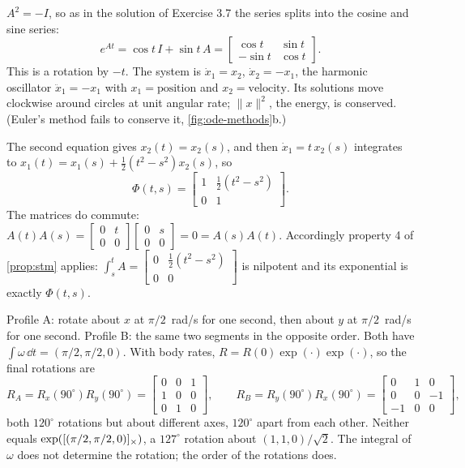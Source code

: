 \begin{solutions}
  \item $A^2 = -I$, so as in the solution of Exercise 3.7 the series splits into the cosine and sine series:
        \[
          e^{At} = \cos t\,I + \sin t\,A = \begin{bmatrix}\cos t & \sin t\\ -\sin t & \cos t\end{bmatrix}.
        \]
        This is a rotation by $-t$. The system is $\dot x_1 = x_2$, $\dot x_2 = -x_1$, the harmonic oscillator $\ddot x_1 = -x_1$ with
        $x_1 = \text{position}$ and $x_2 = \text{velocity}$. Its solutions move clockwise around circles at unit angular rate; $\|x\|^2$, the energy, is
        conserved. (Euler's method fails to conserve it, \cref{fig:ode-methods}b.)

  \item The second equation gives $x_2(t) = x_2(s)$, and then $\dot x_1 = t\,x_2(s)$ integrates to $x_1(t) = x_1(s) + \tfrac12(t^2 - s^2)x_2(s)$, so
        \[
          \Phi(t, s) = \begin{bmatrix}1 & \tfrac12(t^2 - s^2)\\ 0 & 1\end{bmatrix}.
        \]
        The matrices do commute: $A(t)A(s) = \begin{bmatrix}0 & t\\0 & 0\end{bmatrix}\begin{bmatrix}0 & s\\0 & 0\end{bmatrix} = 0 = A(s)A(t)$.
        Accordingly property 4 of \cref{prop:stm} applies: $\int_s^tA = \begin{bmatrix}0 & \frac12(t^2 - s^2)\\0 & 0\end{bmatrix}$ is nilpotent and its
        exponential is exactly $\Phi(t, s)$.

  \item Profile A: rotate about $x$ at $\pi/2$~rad/s for one second, then about $y$ at $\pi/2$~rad/s for one second. Profile B: the same two
        segments in the opposite order. Both have $\int\omega\,\dd t = (\pi/2, \pi/2, 0)$. With body rates, $R = R(0)\exp(\cdot)\exp(\cdot)$, so the final
        rotations are
        \[
          R_A = R_x(90^\circ)R_y(90^\circ) = \begin{bmatrix}0 & 0 & 1\\ 1 & 0 & 0\\ 0 & 1 & 0\end{bmatrix}, \qquad
          R_B = R_y(90^\circ)R_x(90^\circ) = \begin{bmatrix}0 & 1 & 0\\ 0 & 0 & -1\\ -1 & 0 & 0\end{bmatrix},
        \]
        both $120^\circ$ rotations but about different axes, $120^\circ$ apart from each other. Neither equals $\exp([(\pi/2, \pi/2, 0)]_{\times})$, a
        $127^\circ$ rotation about $(1, 1, 0)/\sqrt2$. The integral of $\omega$ does not determine the rotation; the order of the rotations does.


\end{solutions}
